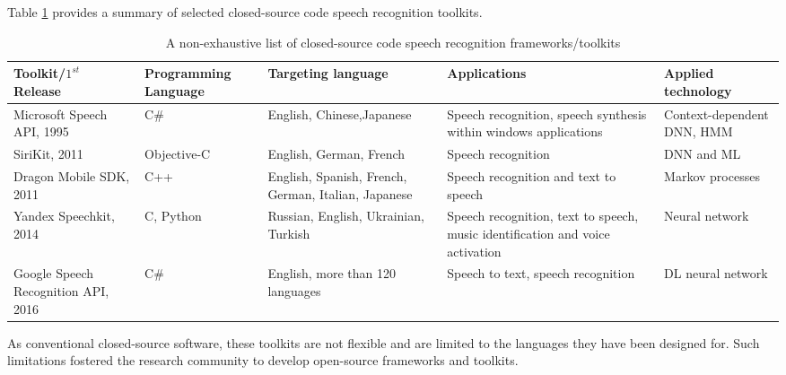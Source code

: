 Table \ref{tab4} provides a summary of selected closed-source code speech recognition toolkits.
\begin{table}
\caption{A non-exhaustive list of closed-source code speech recognition frameworks/toolkits}\label{tab4}
\centering
\begin{tabular}{ p{3cm} p{2cm} p{3cm} p{4cm} p{4cm}}
 \hline
Toolkit/$1^{st}$ Release &Programming Language& Targeting language& Applications& Applied technology\\
 \hline
Microsoft Speech API, 1995& C\#& English, Chinese,Japanese& Speech recognition, speech synthesis within windows applications&
Context-dependent DNN, HMM\\
 SiriKit, 2011&Objective-C&English, German, French& Speech recognition & DNN and ML\\
 Dragon Mobile SDK, 2011& C++&English, Spanish, French, German, Italian, Japanese& Speech recognition and text to speech&Markov processes\\
 Yandex Speechkit, 2014& C, Python&Russian, English, Ukrainian, Turkish&Speech recognition, text to speech, music identification and voice activation&Neural network\\
 Google Speech Recognition API, 2016& C\#&English, more than 120 languages&Speech to text, speech recognition & DL neural network\\
 \hline
\end{tabular}
\end{table}
As conventional closed-source software, these toolkits are not flexible and are limited to the languages they have been designed for. Such limitations fostered the research community to develop open-source frameworks and toolkits.

